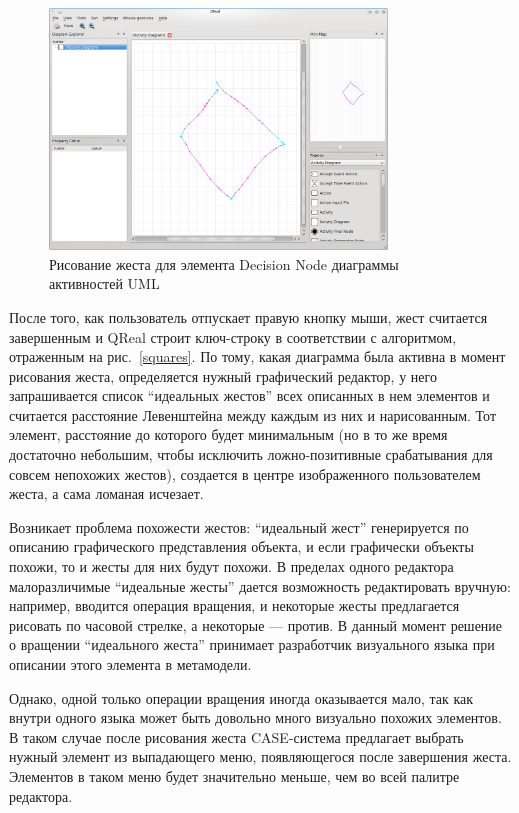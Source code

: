 \documentclass[a5paper]{article}
\begin{document}
\begin{figure} [ht]
  \begin{center}
    \includegraphics[width=0.8\textwidth, bb=0 0 800 600]{05-drawing.png}
    \caption{Рисование жеста для элемента Decision Node диаграммы активностей UML}
    \label{drawing}
  \end{center}
\end{figure}

После того, как пользователь отпускает правую кнопку мыши, жест считается завершенным и QReal строит ключ-строку в соответствии с алгоритмом, отраженным на рис.~\ref{squares}. По тому, какая диаграмма была активна в момент рисования жеста, определяется нужный графический редактор, у него запрашивается список ``идеальных жестов'' всех описанных в нем элементов и считается расстояние Левенштейна между каждым из них и нарисованным. Тот элемент, расстояние до которого будет минимальным (но в то же время достаточно небольшим, чтобы исключить ложно-позитивные срабатывания для совсем непохожих жестов), создается в центре изображенного пользователем жеста, а сама ломаная исчезает. 

Возникает проблема похожести жестов: ``идеальный жест'' генерируется по описанию графического представления объекта, и если графически объекты похожи, то и жесты для них будут похожи. В пределах одного редактора малоразличимые ``идеальные жесты'' дается возможность редактировать вручную: например, вводится операция вращения, и некоторые жесты предлагается рисовать по часовой стрелке, а некоторые --- против. В данный момент решение о вращении ``идеального жеста'' принимает разработчик визуального языка при описании этого элемента в метамодели. 

Однако, одной только операции вращения иногда оказывается мало, так как внутри одного языка может быть довольно много визуально похожих элементов. В таком случае после рисования жеста CASE-система предлагает выбрать нужный элемент из выпадающего меню, появляющегося после завершения жеста. Элементов в таком меню будет значительно меньше, чем во всей палитре редактора.
\end{document}
